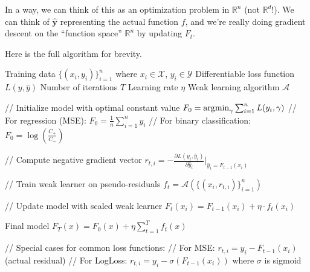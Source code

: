   In a way, we can think of this as an optimization problem in $\mathbb{R}^n$ (not $\mathbb{R}^d$!). We can think of $\hat{\mathbf{y}}$ representing the actual function $f$, and we're really doing gradient descent on the ``function space'' $\mathbb{R}^n$ by updating $F_t$. 

  \begin{algo}
    Here is the full algorithm for brevity. 
    \begin{algorithm}[H]
      \label{alg:gradboost}
      \begin{algorithmic}[1]
        \Require Training data $\{(x_i, y_i)\}_{i=1}^n$ where $x_i \in \mathcal{X}$, $y_i \in \mathcal{Y}$
        \Require Differentiable loss function $L(y, \hat{y})$
        \Require Number of iterations $T$
        \Require Learning rate $\eta$
        \Require Weak learning algorithm $\mathcal{A}$

        \State // Initialize model with optimal constant value
        \State $F_0 = \argmin_\gamma \sum_{i=1}^n L(y_i, \gamma)$
        \State // For regression (MSE): $F_0 = \frac{1}{n}\sum_{i=1}^n y_i$
        \State // For binary classification: $F_0 = \log(\frac{C_+}{C_-})$

            \State // Compute negative gradient vector
                \State $r_{t,i} = -\frac{\partial L(y_i, \hat{y}_i)}{\partial \hat{y}_i}\big|_{\hat{y}_i = F_{t-1}(x_i)}$
            \EndFor
            
            \State // Train weak learner on pseudo-residuals
            \State $f_t = \mathcal{A}(\{(x_i, r_{t,i})\}_{i=1}^n)$
            
            \State // Update model with scaled weak learner
                \State $F_t(x_i) = F_{t-1}(x_i) + \eta \cdot f_t(x_i)$
            \EndFor
        \EndFor

        \State \Return Final model $F_T(x) = F_0(x) + \eta \sum_{t=1}^T f_t(x)$

        \State // Special cases for common loss functions:
        \State // For MSE: $r_{t,i} = y_i - F_{t-1}(x_i)$ (actual residual)
        \State // For LogLoss: $r_{t,i} = y_i - \sigma(F_{t-1}(x_i))$ where $\sigma$ is sigmoid
      \end{algorithmic}
    \end{algorithm}
  \end{algo}

